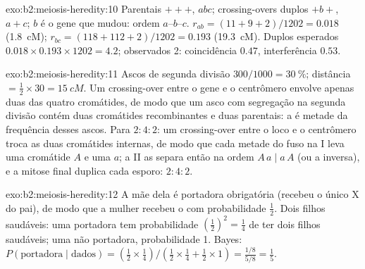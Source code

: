 \begin{solution}{exo:b2:meiosis-heredity:10}
Parentais $+++$, $abc$; crossing-overs duplos $+b+$, $a+c$; $b$ é o
gene que mudou: ordem $a$--$b$--$c$. $r_{ab} = (11 + 9 + 2)/1202
= 0.018$ (\qty{1.8}{cM}); $r_{bc} = (118 + 112 + 2)/1202 = 0.193$
(\qty{19.3}{cM}). Duplos esperados $0.018\times 0.193\times 1202 =
4.2$; observados 2: coincidência $0.47$, interferência $0.53$.
\end{solution}

\begin{solution}{exo:b2:meiosis-heredity:11}
Ascos de segunda divisão $300/1000 = \qty{30}{\%}$; distância $=
\tfrac12\times 30 = \qty{15}{cM}$. Um crossing-over entre o gene e o
centrômero envolve apenas duas das quatro cromátides, de modo que um
asco com segregação na segunda divisão contém duas cromátides
recombinantes e duas parentais: a  é metade
da frequência desses ascos. Para $2 : 4 : 2$: um crossing-over entre o
loco e o centrômero troca as duas cromátides internas, de modo que
cada metade do fuso na  I leva uma cromátide $A$ e uma $a$; a
 II as separa então na ordem $A\,a \mid
a\,A$ (ou a inversa), e a mitose final duplica cada esporo:
$2 : 4 : 2$.
\end{solution}

\begin{solution}{exo:b2:meiosis-heredity:12}
A mãe dela é portadora obrigatória (recebeu o único X do pai), de modo
que a mulher recebeu o  com probabilidade $\tfrac12$. Dois filhos
saudáveis: uma portadora tem probabilidade $(\tfrac12)^2 = \tfrac14$
de ter dois filhos saudáveis; uma não portadora, probabilidade 1.
Bayes:
$P(\text{portadora}\mid\text{dados}) = (\tfrac12\times\tfrac14)/(\tfrac12
\times\tfrac14 + \tfrac12\times 1) = \tfrac{1/8}{5/8} = \tfrac15$.
\end{solution}

